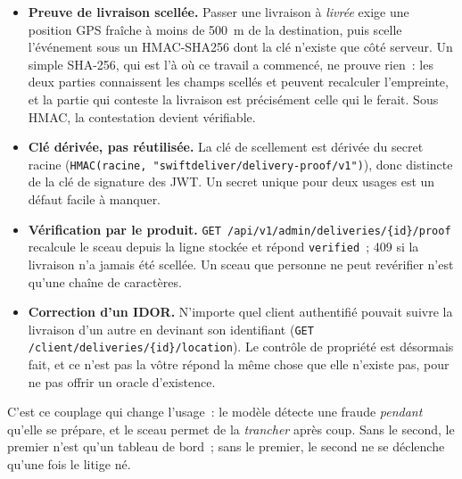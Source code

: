 \documentclass[11pt,a4paper]{article}
\begin{document}
\begin{itemize}[leftmargin=1.4em]
  \item \textbf{Preuve de livraison scell\'ee.} Passer une livraison \`a \emph{livr\'ee} exige une position GPS fra\^iche \`a moins de 500~m de la destination, puis scelle l'\'ev\'enement sous un HMAC-SHA256 dont la cl\'e n'existe que c\^ot\'e serveur. Un simple SHA-256, qui est l'\`a o\`u ce travail a commenc\'e, ne prouve rien~: les deux parties connaissent les champs scell\'es et peuvent recalculer l'empreinte, et la partie qui conteste la livraison est pr\'ecis\'ement celle qui le ferait. Sous HMAC, la contestation devient v\'erifiable.
  \item \textbf{Cl\'e d\'eriv\'ee, pas r\'eutilis\'ee.} La cl\'e de scellement est d\'eriv\'ee du secret racine (\texttt{HMAC(racine, "swiftdeliver/delivery-proof/v1")}), donc distincte de la cl\'e de signature des JWT. Un secret unique pour deux usages est un d\'efaut facile \`a manquer.
  \item \textbf{V\'erification par le produit.} \texttt{GET /api/v1/admin/deliveries/\{id\}/proof} recalcule le sceau depuis la ligne stock\'ee et r\'epond \texttt{verified}~; 409 si la livraison n'a jamais \'et\'e scell\'ee. Un sceau que personne ne peut rev\'erifier n'est qu'une cha\^ine de caract\`eres.
  \item \textbf{Correction d'un IDOR.} N'importe quel client authentifi\'e pouvait suivre la livraison d'un autre en devinant son identifiant (\texttt{GET /client/deliveries/\{id\}/location}). Le contr\^ole de propri\'et\'e est d\'esormais fait, et \og{}ce n'est pas la v\^otre\fg{} r\'epond la m\^eme chose que \og{}elle n'existe pas\fg{}, pour ne pas offrir un oracle d'existence.
\end{itemize}

\noindent
C'est ce couplage qui change l'usage~: le mod\`ele d\'etecte une fraude \emph{pendant} qu'elle se pr\'epare, et le sceau permet de la \emph{trancher} apr\`es coup. Sans le second, le premier n'est qu'un tableau de bord~; sans le premier, le second ne se d\'eclenche qu'une fois le litige n\'e.
\end{document}
